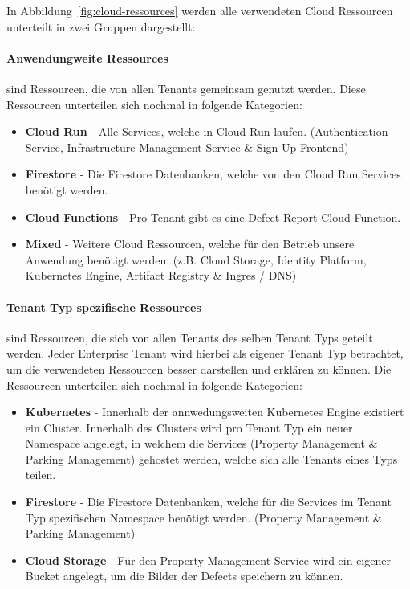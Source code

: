\noindent In Abbildung~\ref{fig:cloud-ressources} werden alle verwendeten Cloud Ressourcen unterteilt in zwei Gruppen dargestellt:
\paragraph{Anwendungweite Ressources}sind Ressourcen, die von allen Tenants gemeinsam genutzt werden.
Diese Ressourcen unterteilen sich nochmal in folgende Kategorien:
\begin{itemize}
	\item \textbf{Cloud Run} - Alle Services, welche in Cloud Run laufen. (Authentication Service, Infrastructure Management Service \& Sign Up Frontend)
	\item \textbf{Firestore} - Die Firestore Datenbanken, welche von den Cloud Run Services benötigt werden.
	\item \textbf{Cloud Functions} - Pro Tenant gibt es eine Defect-Report Cloud Function.
	\item \textbf{Mixed} - Weitere Cloud Ressourcen, welche für den Betrieb unsere Anwendung benötigt werden. (z.B. Cloud Storage, Identity Platform, Kubernetes Engine, Artifact Registry \& Ingres / DNS)
\end{itemize}

\paragraph{Tenant Typ spezifische Ressources}sind Ressourcen, die sich von allen Tenants des selben Tenant Typs geteilt werden.
Jeder Enterprise Tenant wird hierbei als eigener Tenant Typ betrachtet, um die verwendeten Ressourcen besser darstellen und erklären zu können.
Die Ressourcen unterteilen sich nochmal in folgende Kategorien:
\begin{itemize}
	\item \textbf{Kubernetes} - Innerhalb der annwedungsweiten Kubernetes Engine existiert ein Cluster. Innerhalb des Clusters wird pro Tenant Typ ein neuer Namespace angelegt, in welchem die Services (Property Management \& Parking Management) gehostet werden, welche sich alle Tenants eines Typs teilen.
	\item \textbf{Firestore} - Die Firestore Datenbanken, welche für die Services im Tenant Typ spezifischen Namespace benötigt werden. (Property Management \& Parking Management)
	\item \textbf{Cloud Storage} - Für den Property Management Service wird ein eigener Bucket angelegt, um die Bilder der Defects speichern zu können.
\end{itemize}

